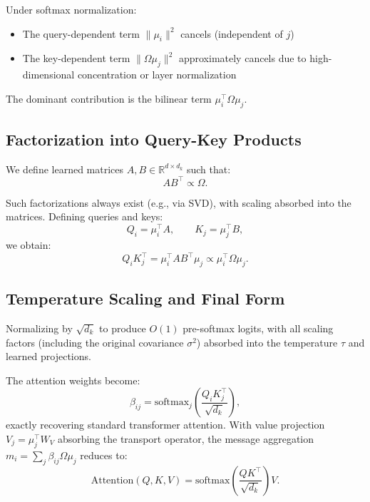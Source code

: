 \documentclass[twoside,11pt]{article}
\begin{document}
Under softmax normalization:
\begin{itemize}
    \item The query-dependent term $\|\mu_i\|^2$ cancels (independent of $j$)
    \item The key-dependent term $\|\Omega\mu_j\|^2$ approximately cancels due to high-dimensional concentration or layer normalization
\end{itemize}

The dominant contribution is the bilinear term $\mu_i^\top \Omega \mu_j$.

\subsection{Factorization into Query-Key Products}

We define learned matrices $A, B \in \mathbb{R}^{d \times d_k}$ such that:
\begin{equation}
AB^\top \propto \Omega.
\end{equation}

Such factorizations always exist (e.g., via SVD), with scaling absorbed into the matrices. Defining queries and keys:
\begin{equation}
Q_i = \mu_i^\top A, \qquad K_j = \mu_j^\top B,
\end{equation}
we obtain:
\begin{equation}
Q_i K_j^\top = \mu_i^\top A B^\top \mu_j \propto \mu_i^\top \Omega \mu_j.
\end{equation}

\subsection{Temperature Scaling and Final Form}

Normalizing by $\sqrt{d_k}$ to produce $O(1)$ pre-softmax logits, with all scaling factors (including the original covariance $\sigma^2$) absorbed into the temperature $\tau$ and learned projections.

The attention weights become:
\begin{equation}
\boxed{\beta_{ij} = \mathrm{softmax}_j\left(\frac{Q_i K_j^\top}{\sqrt{d_k}}\right)},
\end{equation}
exactly recovering standard transformer attention. With value projection $V_j = \mu_j^\top W_V$ absorbing the transport operator, the message aggregation $m_i = \sum_j \beta_{ij} \Omega\mu_j$ reduces to:
\begin{equation}
\boxed{\mathrm{Attention}(Q,K,V) = \mathrm{softmax}\left(\frac{QK^\top}{\sqrt{d_k}}\right)V}.
\end{equation}
\end{document}
